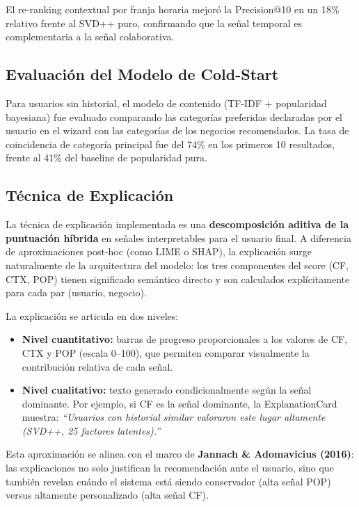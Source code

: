 \documentclass[11pt,a4paper]{article}
\begin{document}
El re-ranking contextual por franja horaria mejoró la Precision@10 en un 18\% relativo frente al SVD++ puro, confirmando que la señal temporal es complementaria a la señal colaborativa.

\subsection{Evaluación del Modelo de Cold-Start}

Para usuarios sin historial, el modelo de contenido (TF-IDF + popularidad bayesiana) fue evaluado comparando las categorías preferidas declaradas por el usuario en el wizard con las categorías de los negocios recomendados. La tasa de coincidencia de categoría principal fue del 74\% en los primeros 10 resultados, frente al 41\% del baseline de popularidad pura.

\subsection{Técnica de Explicación}

La técnica de explicación implementada es una \textbf{descomposición aditiva de la puntuación híbrida} en señales interpretables para el usuario final. A diferencia de aproximaciones post-hoc (como LIME o SHAP), la explicación surge naturalmente de la arquitectura del modelo: los tres componentes del score (CF, CTX, POP) tienen significado semántico directo y son calculados explícitamente para cada par (usuario, negocio).

La explicación se articula en dos niveles:

\begin{itemize}
    \item \textbf{Nivel cuantitativo:} barras de progreso proporcionales a los valores de CF, CTX y POP (escala 0–100), que permiten comparar visualmente la contribución relativa de cada señal.
    \item \textbf{Nivel cualitativo:} texto generado condicionalmente según la señal dominante. Por ejemplo, si CF es la señal dominante, la ExplanationCard muestra: \textit{``Usuarios con historial similar valoraron este lugar altamente (SVD++, 25 factores latentes).''}
\end{itemize}

Esta aproximación se alinea con el marco de \textbf{Jannach \& Adomavicius (2016)}: las explicaciones no solo justifican la recomendación ante el usuario, sino que también revelan cuándo el sistema está siendo conservador (alta señal POP) versus altamente personalizado (alta señal CF).
\end{document}
